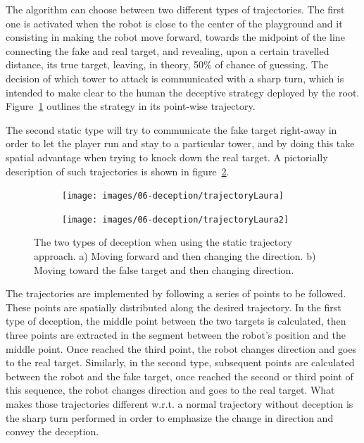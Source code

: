 The algorithm can choose between two different types of trajectories. The first one is activated when the robot is close to the center of the playground and it consisting in making the robot move forward, towards the midpoint of the line connecting the fake and real target, and revealing, upon a certain travelled distance, its true target, leaving, in theory, 50\% of chance of guessing. The decision of which tower to attack is communicated with a sharp turn, which is intended to make clear to the human the deceptive strategy deployed by the root. Figure~\ref{fig:static_deception_1} outlines the strategy in its point-wise trajectory.

The second static type will try to communicate the fake target right-away in order to let the player run and stay to a particular tower, and by doing this take spatial advantage when trying to knock down the real target. A pictorially description of such trajectories is shown in figure~\ref{fig:static_deception_2}.

\begin{figure}[h]
    \centering
    \begin{subfigure}[t]{0.45\columnwidth}
        \centering
        \texttt{[image: images/06-deception/trajectoryLaura]}
        \caption{}
        \label{fig:static_deception_1}
    \end{subfigure}
    \hspace{0.01\columnwidth}
    \begin{subfigure}[t]{0.45\columnwidth}
        \centering
        \texttt{[image: images/06-deception/trajectoryLaura2]}
        \caption{}
        \label{fig:static_deception_2}
    \end{subfigure}
    \caption{The two types of deception when using the static trajectory approach. a) Moving forward and then changing the direction. b) Moving toward the false target and then changing direction.}
    \label{fig::trajectoryStatic}
\end{figure}

The trajectories are implemented by following a series of points to be followed. These points are spatially distributed along the desired trajectory. In the first type of deception, the middle point between the two targets is calculated, then three points are extracted in the segment between the robot's position and the middle point. Once reached the third point, the robot changes direction and goes to the real target. Similarly, in the second type, subsequent points are calculated between the robot and the fake target, once reached the second or third point of this sequence, the robot changes direction and goes to the real target. What makes those trajectories different w.r.t. a normal trajectory without deception is the sharp turn performed in order to emphasize the change in direction and convey the deception.


